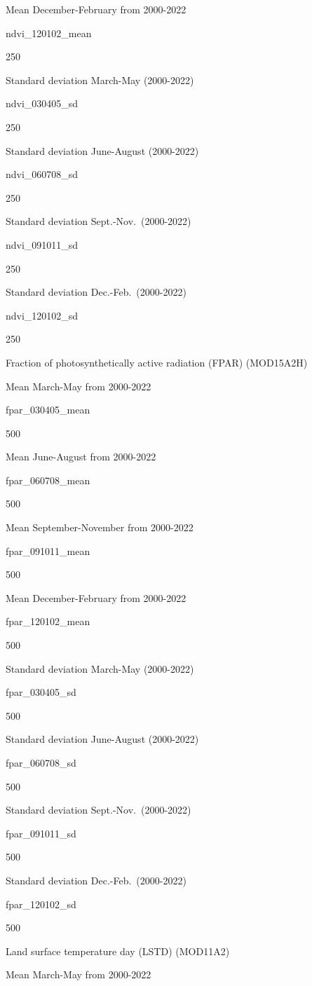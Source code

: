\documentclass[
  10pt,
  b5paper,
  oneside]{book}
\begin{document}
Mean December-February from 2000-2022

ndvi\_120102\_mean

250

Standard deviation March-May (2000-2022)

ndvi\_030405\_sd

250

Standard deviation June-August (2000-2022)

ndvi\_060708\_sd

250

Standard deviation Sept.-Nov.~(2000-2022)

ndvi\_091011\_sd

250

Standard deviation Dec.-Feb.~(2000-2022)

ndvi\_120102\_sd

250

Fraction of photosynthetically active radiation (FPAR) (MOD15A2H)

Mean March-May from 2000-2022

fpar\_030405\_mean

500

Mean June-August from 2000-2022

fpar\_060708\_mean

500

Mean September-November from 2000-2022

fpar\_091011\_mean

500

Mean December-February from 2000-2022

fpar\_120102\_mean

500

Standard deviation March-May (2000-2022)

fpar\_030405\_sd

500

Standard deviation June-August (2000-2022)

fpar\_060708\_sd

500

Standard deviation Sept.-Nov.~(2000-2022)

fpar\_091011\_sd

500

Standard deviation Dec.-Feb.~(2000-2022)

fpar\_120102\_sd

500

Land surface temperature day (LSTD) (MOD11A2)

Mean March-May from 2000-2022
\end{document}
